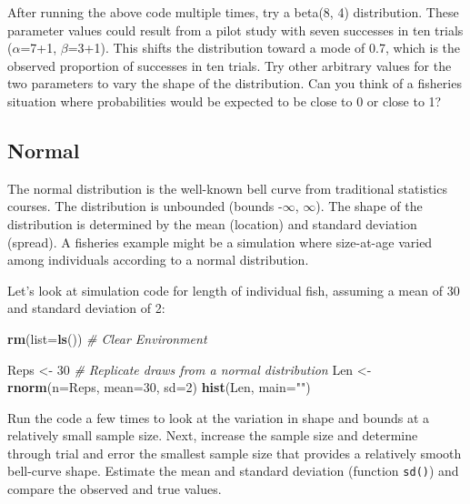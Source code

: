 \documentclass[
]{krantz}
\makeatletter
\newenvironment{Shaded}{\begin{snugshade}}{\end{snugshade}}
\newcommand{\AttributeTok}[1]{\textcolor[rgb]{0.27,0.27,0.27}{#1}}
\newcommand{\CommentTok}[1]{\textcolor[rgb]{0.37,0.37,0.37}{\textit{#1}}}
\newcommand{\DecValTok}[1]{\textcolor[rgb]{0.06,0.06,0.06}{#1}}
\newcommand{\FunctionTok}[1]{\textcolor[rgb]{0.27,0.27,0.27}{\textbf{#1}}}
\newcommand{\NormalTok}[1]{#1}
\newcommand{\OtherTok}[1]{\textcolor[rgb]{0.37,0.37,0.37}{#1}}
\newcommand{\StringTok}[1]{\textcolor[rgb]{0.5,0.5,0.5}{#1}}
\newenvironment{kframe}{%
\medskip{}
\setlength{\fboxsep}{.8em}
 \def\at@end@of@kframe{}%
 \ifinner\ifhmode%
  \def\at@end@of@kframe{\end{minipage}}%
  \begin{minipage}{\columnwidth}%
 \fi\fi%
 \def\FrameCommand##1{\hskip\@totalleftmargin \hskip-\fboxsep
 \colorbox{shadecolor}{##1}\hskip-\fboxsep
     \hskip-\linewidth \hskip-\@totalleftmargin \hskip\columnwidth}%
 \MakeFramed {\advance\hsize-\width
   \@totalleftmargin\z@ \linewidth\hsize
   \@setminipage}}%
 {\par\unskip\endMakeFramed%
 \at@end@of@kframe}
\renewenvironment{Shaded}{\begin{kframe}}{\end{kframe}}
\makeatother
\begin{document}
After running the above code multiple times, try a beta(8, 4) distribution. These parameter values could result from a pilot study with seven successes in ten trials (\(\alpha\)=7+1, \(\beta\)=3+1). This shifts the distribution toward a mode of 0.7, which is the observed proportion of successes in ten trials. Try other arbitrary values for the two parameters to vary the shape of the distribution. Can you think of a fisheries situation where probabilities would be expected to be close to 0 or close to 1?

\hypertarget{normal}{%
\subsection{Normal}\label{normal}}

The normal distribution is the well-known bell curve from traditional statistics courses. The distribution is unbounded (bounds -\(\infty\), \(\infty\)). The shape of the distribution is determined by the mean (location) and standard deviation (spread). A fisheries example might be a simulation where size-at-age varied among individuals according to a normal distribution.

Let's look at simulation code for length of individual fish, assuming a mean of 30 and standard deviation of 2:

\begin{Shaded}
\begin{Highlighting}[]
\FunctionTok{rm}\NormalTok{(}\AttributeTok{list=}\FunctionTok{ls}\NormalTok{()) }\CommentTok{\# Clear Environment}

\NormalTok{Reps }\OtherTok{\textless{}{-}} \DecValTok{30} \CommentTok{\# Replicate draws from a normal distribution}
\NormalTok{Len }\OtherTok{\textless{}{-}} \FunctionTok{rnorm}\NormalTok{(}\AttributeTok{n=}\NormalTok{Reps, }\AttributeTok{mean=}\DecValTok{30}\NormalTok{, }\AttributeTok{sd=}\DecValTok{2}\NormalTok{)}
\FunctionTok{hist}\NormalTok{(Len, }\AttributeTok{main=}\StringTok{""}\NormalTok{)}
\end{Highlighting}
\end{Shaded}

Run the code a few times to look at the variation in shape and bounds at a relatively small sample size. Next, increase the sample size and determine through trial and error the smallest sample size that provides a relatively smooth bell-curve shape. Estimate the mean and standard deviation (function \texttt{sd()}) and compare the observed and true values.
\end{document}
